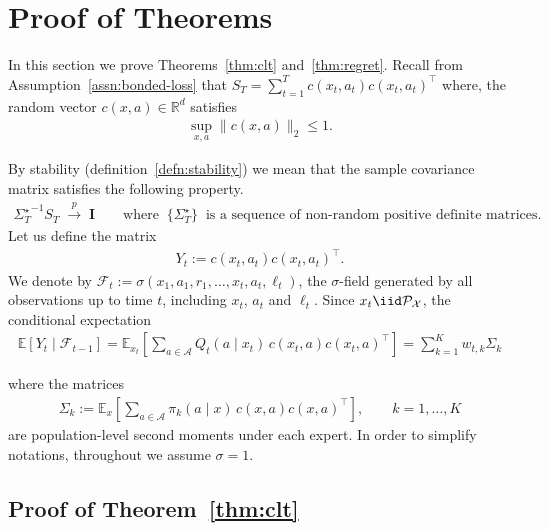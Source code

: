 \documentclass[11pt,letterpaper]{article}
\newcommand{\real}{\mathbb{R}}
\newcommand{\inprob}{\; \stackrel{p}{\rightarrow} \; }
\newcommand{\BT}{{\Sigma^\star_T}}
\newcommand{\cfeat}{c}
\newcommand{\loss}{\ell}
\theoremstyle{plain}
\theoremstyle{definition}  %
\begin{document}
\section{Proof of Theorems}\label{sec:proof_of_theorems}
In this section we prove Theorems~\ref{thm:clt} and~\ref{thm:regret}.
Recall from Assumption~\ref{assn:bonded-loss} that $S_T = \sum^T_{t = 1} \cfeat(x_t, a_t)\cfeat(x_t, a_t)^\top$ where, the random vector $\cfeat(x,a) \in \real^d$ satisfies
\begin{align}
   \sup_{x,a}\|\cfeat(x,a)\|_2  \leq 1. 
\end{align}

\noindent By stability (definition~\eqref{defn:stability}) we mean that the sample covariance matrix satisfies the following property.
%
\begin{align}
\label{eqn:cov-stability}
\BT^{-1}S_T \inprob \mathbf{I} \qquad \text{where} \;\; \{\BT\} \;\; \text{is a sequence of non-random positive definite matrices.}
\end{align}
%
Let us define the matrix 
\begin{align*}
 Y_t := \cfeat(x_t, a_t)\cfeat(x_t, a_t)^\top.   
\end{align*}
We denote by $\mathcal{F}_{t}:=\sigma(x_1,a_1,r_1,\ldots,x_t,a_t,\loss_t)$, the $\sigma$-field generated by all observations up to time $t$,
including $x_t$, $a_t$ and $\loss_t$.
Since $x_t \iid \mathcal{P_X}$, the conditional expectation
\begin{align}\label{defn:condi-Yt}
   \mathbb{E}[Y_t \mid \mathcal{F}_{t-1}]
= \mathbb{E}_{x_t}\!\left[
\sum_{a\in \mathcal{A}} Q_t(a\mid x_t)\,\cfeat(x_t,a)\cfeat(x_t,a)^\top
\right]
= \sum^K_{k=1}w_{t,k}\Sigma_k  
\end{align}

\noindent where the matrices
\begin{align}\label{defn:Sigma}
   \Sigma_k := \mathbb{E}_{x}\!\left[\sum_{a\in \mathcal{A}} \pi_k(a\mid x)\,\cfeat(x,a)\cfeat(x,a)^\top\right],
\qquad k=1,\ldots,K 
\end{align}
are population-level second moments under each expert.
In order to simplify notations, throughout we assume $\sigma = 1$.



\subsection{Proof of Theorem~\ref{thm:clt}}
\label{sec:Proof-of-thm:stability}
%
\end{document}
